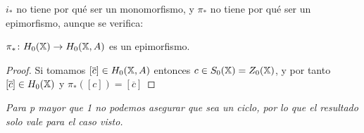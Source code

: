 $i_*$ no tiene por qué ser un monomorfismo, y $\pi_*$ no tiene por qué ser un epimorfismo, aunque se verifica:

\begin{proposition}
  $\pi_* \colon H_0({\mathbb X}) \to H_0({\mathbb X}, A)$ es un epimorfismo.
\end{proposition}

\begin{proof}
  Si tomamos $[\overline{c}] \in H_0({\mathbb X}, A)$ entonces $c \in S_0({\mathbb X}) = Z_0({\mathbb X})$, y por tanto $[\overline{c}] \in H_0({\mathbb X})$ y
  $\pi_*([c]) = [\overline{c}]$
\end{proof}

\textit{Para p mayor que 1 no podemos asegurar que sea un ciclo, por lo que el resultado solo vale para el caso visto.}
